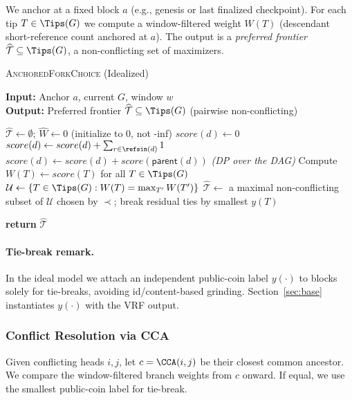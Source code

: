 We anchor at a fixed block $a$ (e.g., genesis or last finalized checkpoint). For each tip $T\in\Tips(G)$ we compute a window-filtered
weight $W(T)$ (descendant short-reference count anchored at $a$). The output is a \emph{preferred frontier} $\widehat{\mathcal T}\subseteq\Tips(G)$,
a non-conflicting set of maximizers. 

\begin{algorithm}[htbp!]
\caption{\textsc{AnchoredForkChoice} (Idealized)}\label{alg:afc-ideal}
\label{alg:ideal-anchored-fc}

\textbf{Input:} Anchor $a$, current $G$, window $w$\\
\textbf{Output:} Preferred frontier $\widehat{\mathcal T}\subseteq\Tips(G)$ (pairwise non-conflicting) 
\begin{algorithmic}[1]
\State $\widehat{\mathcal T} \leftarrow \emptyset$; $\widehat{W} \leftarrow 0$ \hfill  (initialize to 0, not -inf)
  \State $score(d)\leftarrow 0$
\EndFor
{}
  \State $score(d) \gets score(d) + \sum_{r\in\refsin(d)} 1$
  \State $score(d) \gets score(d) + score(\textsf{parent}(d))$ \hfill \textit{(DP over the DAG)}
\EndFor
\State Compute $W(T)\gets score(T)$ for all $T\in\Tips(G)$
\State $\mathcal U \gets \{T\in\Tips(G): W(T)=\max_{T'} W(T')\}$
\State $\widehat{\mathcal T} \gets$ a maximal non-conflicting subset of $\mathcal U$ chosen by $\prec$; break residual ties by smallest $y(T)$ 

\State \textbf{return} $\widehat{\mathcal T}$
\end{algorithmic}
\end{algorithm}

\paragraph{Tie-break remark.} 
In the ideal model we attach an independent public-coin label $y(\cdot)$ to blocks solely for tie-breaks, avoiding id/content-based grinding.
Section~\ref{sec:base} instantiates $y(\cdot)$ with the VRF output.

\subsubsection{Conflict Resolution via CCA}
\label{subsec:alg5}
Given conflicting heads $i,j$, let $c=\CCA(i,j)$ be their closest common ancestor. We compare the window-filtered branch weights from $c$ onward.
If equal, we use the smallest public-coin label for tie-break. 

